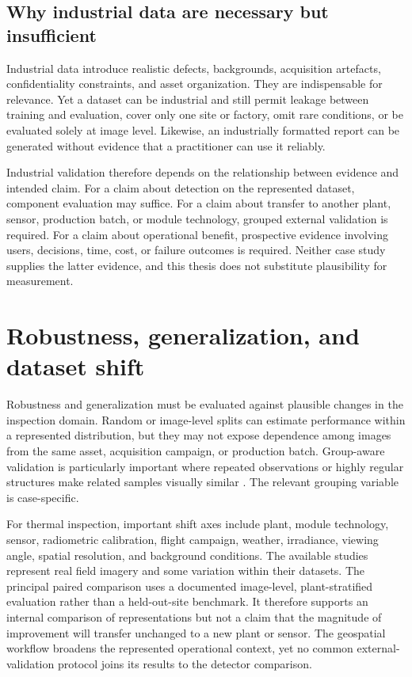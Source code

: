 \documentclass[12pt,a4paper]{report}
\begin{document}
\subsection{Why industrial data are necessary but insufficient}

Industrial data introduce realistic defects, backgrounds, acquisition artefacts, confidentiality constraints, and asset organization. They are indispensable for relevance. Yet a dataset can be industrial and still permit leakage between training and evaluation, cover only one site or factory, omit rare conditions, or be evaluated solely at image level. Likewise, an industrially formatted report can be generated without evidence that a practitioner can use it reliably.

Industrial validation therefore depends on the relationship between evidence and intended claim. For a claim about detection on the represented dataset, component evaluation may suffice. For a claim about transfer to another plant, sensor, production batch, or module technology, grouped external validation is required. For a claim about operational benefit, prospective evidence involving users, decisions, time, cost, or failure outcomes is required. Neither case study supplies the latter evidence, and this thesis does not substitute plausibility for measurement.

\section{Robustness, generalization, and dataset shift}
\label{sec:ch07-robustness}

Robustness and generalization must be evaluated against plausible changes in the inspection domain. Random or image-level splits can estimate performance within a represented distribution, but they may not expose dependence among images from the same asset, acquisition campaign, or production batch. Group-aware validation is particularly important where repeated observations or highly regular structures make related samples visually similar \citep{src066,src067}. The relevant grouping variable is case-specific.

For thermal inspection, important shift axes include plant, module technology, sensor, radiometric calibration, flight campaign, weather, irradiance, viewing angle, spatial resolution, and background conditions. The available studies represent real field imagery and some variation within their datasets. The principal paired comparison uses a documented image-level, plant-stratified evaluation rather than a held-out-site benchmark. It therefore supports an internal comparison of representations but not a claim that the magnitude of improvement will transfer unchanged to a new plant or sensor. The geospatial workflow broadens the represented operational context, yet no common external-validation protocol joins its results to the detector comparison.
\end{document}
